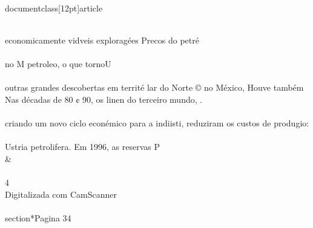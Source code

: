 \\documentclass[12pt]{article}
\begin{document}
{\\
economicamente vidveis exploragées Precos do petré\\
\\
no M petroleo, o que tornoU\\
\\
outras grandes descobertas em territé lar do Norte © no México, Houve também\\
Nas décadas de 80 ¢ 90, os linen do terceiro mundo, .\\
\\
criando um novo ciclo econémico para a indiisti, reduziram os custos de produgio:\\
\\
Ustria petrolifera. Em 1996, as reservas P\\&\\
\\
4\\
Digitalizada com CamScanner\\

\\section*{Pagina 34}

}
\end{document}
